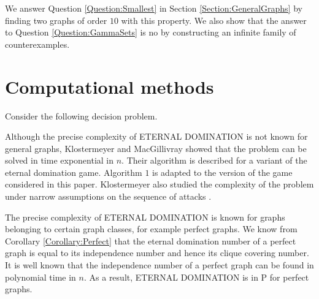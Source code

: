 \documentclass[11pt]{article}
\begin{document}
	We answer Question \ref{Question:Smallest} in Section \ref{Section:GeneralGraphs} by finding two graphs of order $10$ with this property. We also show that the answer to Question \ref{Question:GammaSets} is no by constructing an infinite family of counterexamples.


	\section{Computational methods} \label{Section:Algorithms}
	Consider the following decision problem.
	\begin{center}
	\end{center}
	
	Although the precise complexity of ETERNAL DOMINATION is not known for general graphs, Klostermeyer and MacGillivray \cite{klostermeyer2016dynamic} showed that the problem can be solved in time exponential in $n$. Their algorithm is described for a variant of the eternal domination game. Algorithm $1$ is adapted to the version of the game considered in this paper. Klostermeyer also studied the complexity of the problem under narrow assumptions on the sequence of attacks \cite{klostermeyer2007complexity}.
	
	The precise complexity of ETERNAL DOMINATION is known for graphs belonging to certain graph classes, for example perfect graphs. We know from Corollary \ref{Corollary:Perfect} that the eternal domination number of a perfect graph is equal to its independence number and hence its clique covering number. It is well known \cite{grtschel1988geometric} that the independence number of a perfect graph can be found in polynomial time in $n$. As a result, ETERNAL DOMINATION is in P for perfect graphs.
	
\end{document}
